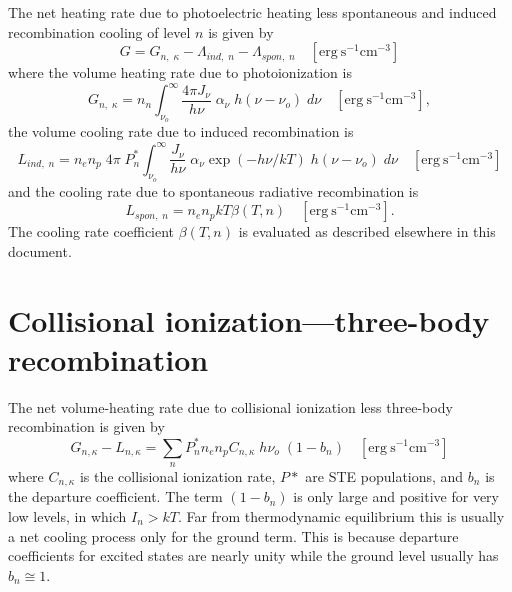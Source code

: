 The net heating rate due to photoelectric heating less spontaneous and
induced recombination cooling of level $n$ is given by
\begin{equation}
G = {G_{n,\;\kappa }} - {\Lambda _{ind,\;n}} - {\Lambda _{spon,\;n}}\quad
[\mathrm{erg~s}^{-1} \mathrm{cm}^{-3}]
\end{equation}
where the volume heating rate due to photoionization is
\begin{equation}
{G_{n,\;\kappa }} = {n_n}\int_{{\nu _o}}^\infty  {\frac{{4\pi {J_\nu
}}}{{h\nu }}\;{\alpha _\nu }\;h\left( {\nu  - {\nu _o}} \right)\;d\nu }
\quad [\mathrm{erg~s}^{-1} \mathrm{cm}^{-3}],
\end{equation}
the volume cooling rate due to induced recombination is
\begin{equation}
{L_{ind,\;n}} = {n_e}{n_p}\;4\pi \;P_n^*\int_{{\nu _o}}^\infty
{\frac{{{J_\nu }}}{{h\nu }}\;{\alpha _\nu }\exp \left( { - h\nu /kT}
\right)\;h\left( {\nu  - {\nu _o}} \right)\;d\nu }
\quad [\mathrm{erg~s}^{-1}\mathrm{cm}^{-3}]
\end{equation}
and the cooling rate due to spontaneous radiative recombination is
\begin{equation}
{L_{spon,\;n}} = {n_e}{n_p}kT\beta \left( {T,n} \right)\quad
[\mathrm{erg~s}^{-1} \mathrm{cm}^{-3}] .
\end{equation}
The cooling rate coefficient $\beta(T,n)$ is evaluated as described
elsewhere in this document.

\section{Collisional ionization---three-body recombination}

The net volume-heating rate due to collisional ionization less three-body
recombination is given by
\begin{equation}
{G_{n,\kappa }} - {L_{n,\kappa }} = \sum\limits_n
{P_n^*{n_e}{n_p}{C_{n,\kappa }}\;h{\nu _o}\;\left( {1 - {b_n}} \right)}
\quad [\mathrm{erg~s}^{-1} \mathrm{cm}^{-3}]
\end{equation}
where $C_{n,\kappa}$ is the collisional ionization rate, $P*$ are STE populations, and
$b_n$ is the departure coefficient.  The term $(1 - b_n)$ is only large and
positive for very low levels, in which $I_n > kT$.  Far from thermodynamic
equilibrium this is usually a net cooling process only for the ground term.
This is because departure coefficients for excited states are nearly unity
while the ground level usually has $b_n\cong 1$.

